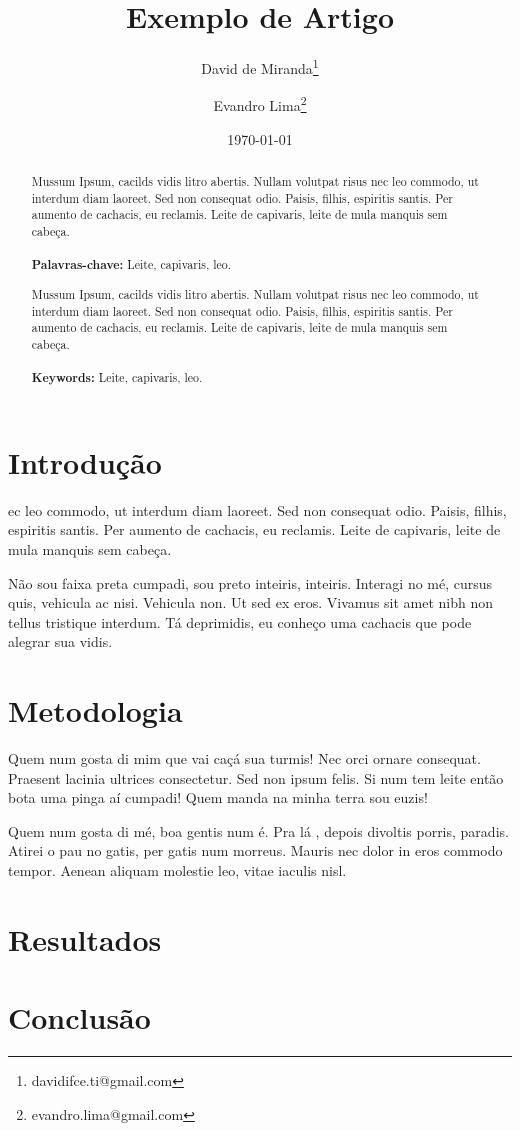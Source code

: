 \documentclass[12pt,a4paper,twoside]{article}
\title{Exemplo de Artigo}
\author{
David de Miranda\thanks{davidifce.ti@gmail.com}

\and

Evandro Lima\thanks{evandro.lima@gmail.com}  
}
\date{\today}
\begin{document}
\maketitle %

\begin{abstract}
\noindent Mussum Ipsum, cacilds vidis litro abertis. Nullam volutpat risus nec leo commodo, ut interdum diam laoreet. Sed non consequat odio. Paisis, filhis, espiritis santis. Per aumento de cachacis, eu reclamis. Leite de capivaris, leite de mula manquis sem cabeça.\\\\
\textbf{Palavras-chave: } Leite, capivaris, leo.
\end{abstract}

\begin{abstract}
\noindent Mussum Ipsum, cacilds vidis litro abertis. Nullam volutpat risus nec leo commodo, ut interdum diam laoreet. Sed non consequat odio. Paisis, filhis, espiritis santis. Per aumento de cachacis, eu reclamis. Leite de capivaris, leite de mula manquis sem cabeça.\\\\
\textbf{Keywords: } Leite, capivaris, leo.
\end{abstract}

\section{Introdução}
ec leo commodo, ut interdum diam laoreet. Sed non consequat odio. Paisis, filhis, espiritis santis. Per aumento de cachacis, eu reclamis. Leite de capivaris, leite de mula manquis sem cabeça\cite{coiera1996artificial}.

Não sou faixa preta cumpadi, sou preto inteiris, inteiris. Interagi no mé, cursus quis, vehicula ac nisi. Vehicula non. Ut sed ex eros. Vivamus sit amet nibh non tellus tristique interdum. Tá deprimidis, eu conheço uma cachacis que pode alegrar sua vidis.

\section{Metodologia}
Quem num gosta di mim que vai caçá sua turmis! Nec orci ornare consequat. Praesent lacinia ultrices consectetur. Sed non ipsum felis. Si num tem leite então bota uma pinga aí cumpadi! Quem manda na minha terra sou euzis!

Quem num gosta di mé, boa gentis num é. Pra lá , depois divoltis porris, paradis. Atirei o pau no gatis, per gatis num morreus. Mauris nec dolor in eros commodo tempor. Aenean aliquam molestie leo, vitae iaculis nisl.

\section{Resultados}

\section{Conclusão}

\end{document}
